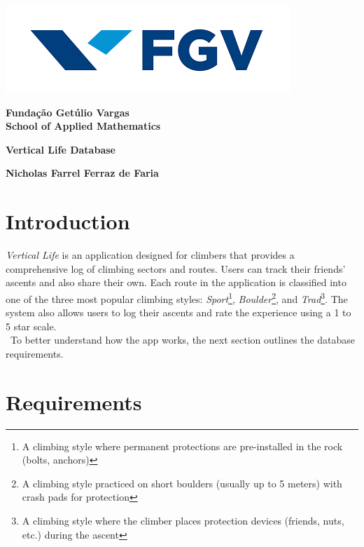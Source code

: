 \documentclass[12pt, a4paper]{article}
\begin{document}
\begin{center} 
        \includegraphics[scale = 0.5]{FGV_logo.png}
        
        \textbf{Fundação Getúlio Vargas}\\
        \textbf{School of Applied Mathematics}

        \vspace{3cm}
        \textbf{\Large Vertical Life Database}

        \vspace{12cm}
        \textbf{Nicholas Farrel Ferraz de Faria}
\end{center}

\newpage

\section{Introduction}

\textit{Vertical Life} is an application designed for climbers that provides a comprehensive log of climbing sectors and routes. Users can track their friends' ascents and also share their own. Each route in the application is classified into one of the three most popular climbing styles:
\textit{Sport}\footnote{A climbing style where permanent protections are pre-installed in the rock (bolts, anchors)},
\textit{Boulder}\footnote{A climbing style practiced on short boulders (usually up to 5 meters) with crash pads for protection}, and
\textit{Trad}\footnote{A climbing style where the climber places protection devices (friends, nuts, etc.) during the ascent}.
The system also allows users to log their ascents and rate the experience using a 1 to 5 star scale.\\
\ To better understand how the app works, the next section outlines the database requirements.

\section{Requirements}
\end{document}
